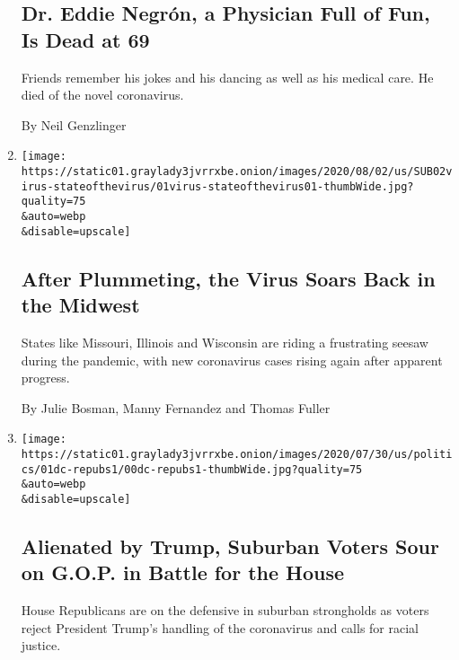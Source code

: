 \begin{enumerate}
  \hypertarget{dr-eddie-negruxf3n-a-physician-full-of-fun-is-dead-at-69}{%
  \subsection{Dr. Eddie Negrón, a Physician Full of Fun, Is Dead at
  69}\label{dr-eddie-negruxf3n-a-physician-full-of-fun-is-dead-at-69}}

  Friends remember his jokes and his dancing as well as his medical
  care. He died of the novel coronavirus.

  By Neil Genzlinger
\item
  \href{/2020/08/01/us/coronavirus-midwest-cases-deaths.html}{}

  \texttt{[image: https://static01.graylady3jvrrxbe.onion/images/2020/08/02/us/SUB02virus-stateofthevirus/01virus-stateofthevirus01-thumbWide.jpg?quality=75\\\&auto=webp\\\&disable=upscale]}

  \hypertarget{after-plummeting-the-virus-soars-back-in-the-midwest-1}{%
  \subsection{After Plummeting, the Virus Soars Back in the
  Midwest}\label{after-plummeting-the-virus-soars-back-in-the-midwest-1}}

  States like Missouri, Illinois and Wisconsin are riding a frustrating
  seesaw during the pandemic, with new coronavirus cases rising again
  after apparent progress.

  By Julie Bosman, Manny Fernandez and Thomas Fuller
\item
  \href{/2020/08/01/us/politics/trump-suburban-voters-republicans-house.html}{}

  \texttt{[image: https://static01.graylady3jvrrxbe.onion/images/2020/07/30/us/politics/01dc-repubs1/00dc-repubs1-thumbWide.jpg?quality=75\\\&auto=webp\\\&disable=upscale]}

  \hypertarget{alienated-by-trump-suburban-voters-sour-on-gop-in-battle-for-the-house}{%
  \subsection{Alienated by Trump, Suburban Voters Sour on G.O.P. in
  Battle for the
  House}\label{alienated-by-trump-suburban-voters-sour-on-gop-in-battle-for-the-house}}

  House Republicans are on the defensive in suburban strongholds as
  voters reject President Trump's handling of the coronavirus and calls
  for racial justice.


\end{enumerate}
